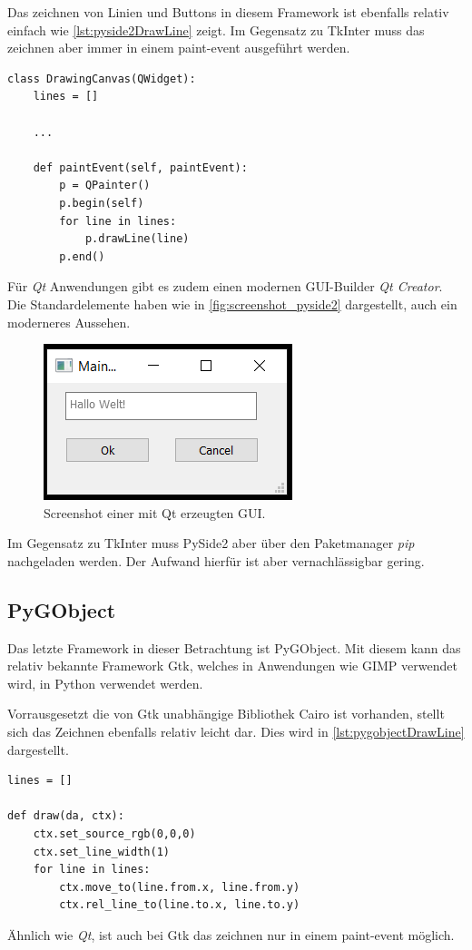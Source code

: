 Das zeichnen von Linien und Buttons in diesem Framework ist ebenfalls relativ einfach wie \autoref{lst:pyside2DrawLine} zeigt. Im Gegensatz zu TkInter muss das zeichnen aber immer in einem paint-event ausgeführt werden.
\begin{lstlisting}[caption={Zeichnen von Linien mit Qt},label=lst:pyside2DrawLine]
class DrawingCanvas(QWidget):
	lines = []
	
	...

	def paintEvent(self, paintEvent):
    	p = QPainter()
    	p.begin(self)
    	for line in lines:
	    	p.drawLine(line)
    	p.end()
\end{lstlisting}
Für \textit{Qt} Anwendungen gibt es zudem einen modernen \ac{GUI}-Builder \textit{Qt Creator}. Die Standardelemente haben wie in \autoref{fig:screenshot_pyside2} dargestellt, auch ein moderneres Aussehen.

\begin{figure}[h]
\begin{center}
\includegraphics[scale=0.7]{images/pyside2_screenshot.png}
\caption{Screenshot einer mit Qt erzeugten GUI.}
\label{fig:screenshot_pyside2}
\end{center}
\end{figure}

Im Gegensatz zu TkInter muss PySide2 aber über den Paketmanager \textit{pip} nachgeladen werden. Der Aufwand hierfür ist aber vernachlässigbar gering.

\subsection{PyGObject}
Das letzte Framework in dieser Betrachtung ist PyGObject. Mit diesem kann das relativ bekannte Framework Gtk, welches in Anwendungen wie GIMP verwendet wird, in Python verwendet werden.

Vorrausgesetzt die von Gtk unabhängige Bibliothek Cairo ist vorhanden, stellt sich das Zeichnen ebenfalls relativ leicht dar. Dies wird in \autoref{lst:pygobjectDrawLine} dargestellt.
\begin{lstlisting}[caption={Zeichnen von Linien mit Gtk},label=lst:pygobjectDrawLine]
lines = []

def draw(da, ctx):
	ctx.set_source_rgb(0,0,0)
	ctx.set_line_width(1)
	for line in lines:
		ctx.move_to(line.from.x, line.from.y)
		ctx.rel_line_to(line.to.x, line.to.y)
\end{lstlisting}
Ähnlich wie \textit{Qt}, ist auch bei Gtk das zeichnen nur in einem paint-event möglich.

